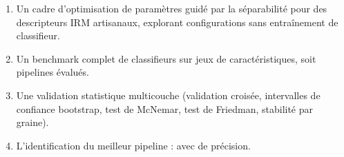 \begin{enumerate}
  \item Un cadre d'optimisation de paramètres guidé par la séparabilité pour des
        descripteurs IRM artisanaux, explorant \NPhaseOneConfigs{} configurations
        sans entraînement de classifieur.
  \item Un benchmark complet de \NModels{} classifieurs sur \NFeatureSets{} jeux
        de caractéristiques, soit \NRuns{} pipelines évalués.
  \item Une validation statistique multicouche (validation croisée, intervalles de
        confiance bootstrap, test de McNemar, test de Friedman, stabilité par graine).
  \item L'identification du meilleur pipeline : \BestPipeline{} avec \BestAcc{} de précision.
\end{enumerate}
